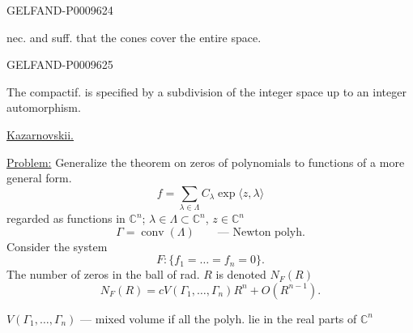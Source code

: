 \begin{GelfandAdjacentEvidence}{GELFAND-P000962}{4}


 nec. and suff. that the cones cover the entire space.

\end{GelfandAdjacentEvidence}
\begin{GelfandAdjacentEvidence}{GELFAND-P000962}{5}


The compactif. is specified by a subdivision of the integer space up to an integer automorphism.

\underline{\underline{Kazarnovskii.}}

\underline{Problem:} Generalize the theorem on zeros of polynomials to functions of a more general form.
\begin{equation*}
 f=\sum_{\lambda\in\Lambda}C_\lambda\exp\langle z,\lambda\rangle\tag{1}
\end{equation*}
regarded as functions in $\mathbb{C}^n$; $\lambda\in\Lambda\subset\mathbb{C}^n$, $z\in\mathbb{C}^n$
\[
 \Gamma=\operatorname{conv}(\Lambda)\qquad\text{--- Newton polyh.}
\]
Consider the system
\[
 F:\{f_1=\ldots=f_n=0\}.
\]
The number of zeros in the ball of rad. $R$ is denoted $N_F(R)$
\begin{equation*}
 N_F(R)=cV(\Gamma_1,\ldots,\Gamma_n)R^n+O(R^{n-1}).\tag{2}
\end{equation*}
\end{GelfandAdjacentEvidence}


$V(\Gamma_1,\ldots,\Gamma_n)$ --- mixed volume if all the polyh. lie in the real parts of $\mathbb{C}^n$

